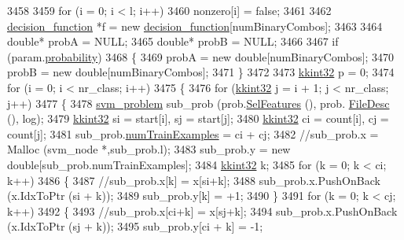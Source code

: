 \begin{DoxyCode}
{3458 
3459     \textcolor{keywordflow}{for}  (i = 0;  i < l;  i++)
3460       nonzero[i] = \textcolor{keyword}{false};
3461 
3462     \hyperlink{struct_s_v_m289___m_f_s_1_1decision__function}{decision\_function} *f = \textcolor{keyword}{new} \hyperlink{struct_s_v_m289___m_f_s_1_1decision__function}{decision\_function}[numBinaryCombos];
3463 
3464     \textcolor{keywordtype}{double}*  probA = NULL;
3465     \textcolor{keywordtype}{double}*  probB = NULL;
3466 
3467     \textcolor{keywordflow}{if} (param.\hyperlink{struct_s_v_m289___m_f_s_1_1svm__parameter_a34eba918ae65f56f3186bbdeae8ccd4b}{probability})
3468     \{
3469       probA = \textcolor{keyword}{new} \textcolor{keywordtype}{double}[numBinaryCombos];
3470       probB = \textcolor{keyword}{new} \textcolor{keywordtype}{double}[numBinaryCombos];
3471     \}
3472 
3473     \hyperlink{namespace_k_k_b_a8fa4952cc84fda1de4bec1fbdd8d5b1b}{kkint32} p = 0;
3474     \textcolor{keywordflow}{for}  (i = 0;  i < nr\_class;  i++)
3475     \{
3476       \textcolor{keywordflow}{for}  (\hyperlink{namespace_k_k_b_a8fa4952cc84fda1de4bec1fbdd8d5b1b}{kkint32} j = i + 1;  j < nr\_class;  j++)
3477       \{
3478         \hyperlink{struct_s_v_m289___m_f_s_1_1svm__problem}{svm\_problem}  sub\_prob (prob.\hyperlink{struct_s_v_m289___m_f_s_1_1svm__problem_abf41e96f4e6b9af73afab424460b53da}{SelFeatures} (), prob.
      \hyperlink{struct_s_v_m289___m_f_s_1_1svm__problem_a4b0a7bee7be16b685372bc6d2cfcda8d}{FileDesc} (), log);
3479         \hyperlink{namespace_k_k_b_a8fa4952cc84fda1de4bec1fbdd8d5b1b}{kkint32} si = start[i], sj = start[j];
3480         \hyperlink{namespace_k_k_b_a8fa4952cc84fda1de4bec1fbdd8d5b1b}{kkint32} ci = count[i], cj = count[j];
3481         sub\_prob.\hyperlink{struct_s_v_m289___m_f_s_1_1svm__problem_a16d137e053c79776e064691a20fa80ee}{numTrainExamples} = ci + cj;
3482         \textcolor{comment}{//sub\_prob.x = Malloc (svm\_node *,sub\_prob.l);}
3483         sub\_prob.y = \textcolor{keyword}{new} \textcolor{keywordtype}{double}[sub\_prob.numTrainExamples];
3484         \hyperlink{namespace_k_k_b_a8fa4952cc84fda1de4bec1fbdd8d5b1b}{kkint32} k;
3485         \textcolor{keywordflow}{for}  (k = 0;  k < ci;  k++)
3486         \{
3487           \textcolor{comment}{//sub\_prob.x[k] = x[si+k];}
3488           sub\_prob.x.PushOnBack (x.IdxToPtr (si + k));
3489           sub\_prob.y[k] = +1;
3490         \}
3491         \textcolor{keywordflow}{for}  (k = 0;  k < cj;  k++)
3492         \{
3493           \textcolor{comment}{//sub\_prob.x[ci+k] = x[sj+k];}
3494           sub\_prob.x.PushOnBack (x.IdxToPtr (sj + k));
3495           sub\_prob.y[ci + k] = -1;
}
\end{DoxyCode}

